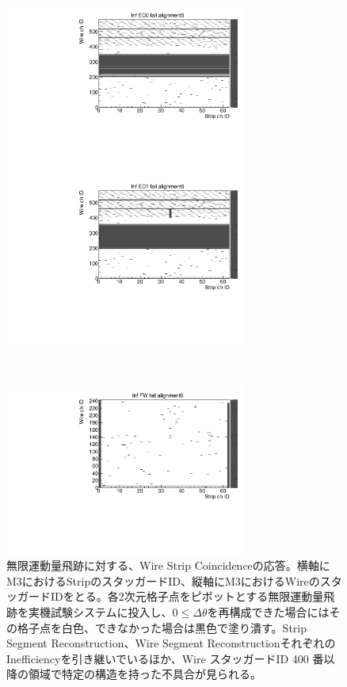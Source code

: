 \begin{figure}
    \begin{minipage}[b]{.5\linewidth}
        \centering
        \includegraphics[height=5.6cm]{fig/Test/B_InfEC0_WS.pdf}
    \end{minipage}
    \begin{minipage}[b]{.5\linewidth}
        \centering
        \includegraphics[height=5.6cm]{fig/Test/B_InfEC1_WS.pdf}
    \end{minipage}\\
    \begin{minipage}[b]{\linewidth}
        \centering
        \includegraphics[height=5.6cm]{fig/Test/B_InfFW_WS.pdf}
    \end{minipage}
    \caption[無限運動量飛跡に対する、Wire Strip Coincidenceの応答]{無限運動量飛跡に対する、Wire Strip Coincidenceの応答。横軸にM3におけるStripのスタッガードID、縦軸にM3におけるWireのスタッガードIDをとる。各2次元格子点をピボットとする無限運動量飛跡を実機試験システムに投入し、$0 \leq \Delta\theta$を再構成できた場合にはその格子点を白色、できなかった場合は黒色で塗り潰す。Strip Segment Reconstruction、Wire Segment ReconstructionそれぞれのInefficiencyを引き継いでいるほか、Wire スタッガードID 400 番以降の領域で特定の構造を持った不具合が見られる。}
    \label{Inf_B_WS}
\end{figure}

